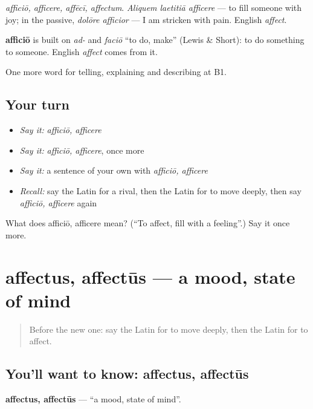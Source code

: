\emph{afficiō, afficere, affēcī, affectum}. \emph{Aliquem laetitiā afficere} — to fill someone with joy; in the passive, \emph{dolōre afficior} — I am stricken with pain. English \emph{affect}.

\begin{cousinweb}
\textbf{afficiō} is built on \emph{ad-} and \emph{faciō} \textquotedblleft{}to do, make\textquotedblright{} (Lewis \& Short): to do something to someone. English \emph{affect} comes from it.
\end{cousinweb}

\begin{grammarlens}[title={What you've built}]
One more word for telling, explaining and describing at B1.
\end{grammarlens}

\subsection*{Your turn}
\begin{itemize}
\raggedright
  \item \emph{Say it:} \emph{afficiō, afficere}
  \item \emph{Say it:} \emph{afficiō, afficere}, once more
  \item \emph{Say it:} a sentence of your own with \emph{afficiō, afficere}
  \item \emph{Recall:} say the Latin for a rival, then the Latin for to move deeply, then say \emph{afficiō, afficere} again
\end{itemize}

\begin{tcolorbox}[breakable,colback=teal!4,colframe=teal!35!black,title={Before you move on}]
What does afficiō, afficere mean? (\textquotedblleft{}To affect, fill with a feeling\textquotedblright{}.) Say it once more.
\end{tcolorbox}
\section[affectus, affectūs]{affectus, affectūs — a mood, state of mind}

\label{lesson:LA-C501-affectus}



\begin{quote}
Before the new one: say the Latin for to move deeply, then the Latin for to affect.
\end{quote}

\subsection*{You'll want to know: affectus, affectūs}
\textbf{affectus, affectūs} — \textquotedblleft{}a mood, state of mind\textquotedblright{}.

